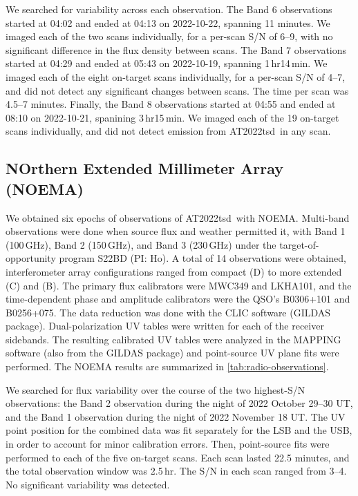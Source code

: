 \documentclass{nature_plusfigure}
\newcommand{\at}{AT2022tsd}
\begin{document}
\begin{methods}
We searched for variability across each observation. The Band 6 observations started at 04:02 and ended at 04:13 on 2022-10-22, spanning 11 minutes. We imaged each of the two scans individually, for a per-scan S/N of 6--9, with no significant difference in the flux density between scans.
The Band 7 observations started at 04:29 and ended at 05:43 on 2022-10-19, spanning 1\,hr14\,min.
We imaged each of the eight on-target scans individually, for a per-scan S/N of 4--7, and did not detect any significant changes between scans. The time per scan was 4.5--7 minutes.
Finally, the Band 8 observations started at 04:55 and ended at 08:10 on 2022-10-21, spanining 3\,hr15\,min. We imaged each of the 19 on-target scans individually, and did not detect emission from \at\ in any scan.

\subsection{NOrthern Extended Millimeter Array (NOEMA)}
\label{Methods:NOEMA}

We obtained six epochs of observations of \at\ with NOEMA. Multi-band observations were done when source flux and weather permitted it, with Band 1 (100\,GHz), Band 2 (150\,GHz), and Band 3 (230\,GHz) under the target-of-opportunity program S22BD (PI: Ho). A total of 14 observations were obtained, interferometer array configurations ranged from compact (D) to more extended (C) and (B). The primary flux calibrators were MWC349 and LKHA101, and the time-dependent phase and amplitude calibrators were the QSO's B0306+101 and B0256+075. The data reduction was done with the CLIC software (GILDAS package\cite{GILDAS}). 
Dual-polarization UV tables were written for each of the receiver sidebands. The resulting calibrated UV tables were analyzed in the MAPPING software (also from the GILDAS package) and point-source UV plane fits were performed.
The NOEMA results are summarized in \ref{tab:radio-observations}.

We searched for flux variability over the course of the two highest-S/N observations: the Band 2 observation during the night of 2022 October 29--30 UT, and the Band 1 observation during the night of 2022 November 18 UT.
The UV point position for the combined data was fit separately for the LSB and the USB, in
order to account for minor calibration errors.
Then, point-source fits were performed to each of the five on-target scans. Each scan lasted 22.5 minutes, and the total observation window was 2.5\,hr. The S/N in each scan ranged from 3--4. No significant variability was detected.


\end{methods}
\end{document}
